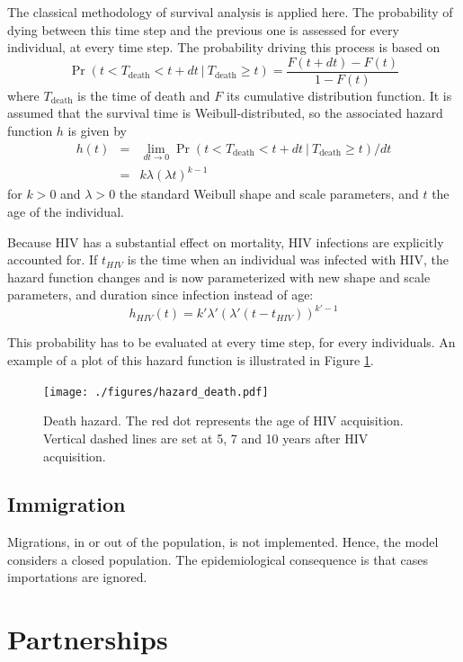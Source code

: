 \documentclass[11pt, onecolumn]{article}
\begin{document}
The classical methodology of survival analysis is applied here. The probability of dying between this time step and the previous one is assessed for every individual, at every time step. The probability driving this process is based on 
$$\Pr(t<T_{\mathrm{death}}<t+dt \ | \ T_{\mathrm{death}}\geq t) = \frac{F(t+dt)-F(t)}{1-F(t)}$$
where $T_{\mathrm{death}}$ is the time of death and $F$ its cumulative distribution function. It is assumed that the survival time is Weibull-distributed, so the associated hazard function $h$  is given by
\begin{eqnarray}
h(t) &=& \lim_{dt\to 0}\Pr(t<T_{\mathrm{death}}<t+dt \ | \ T_{\mathrm{death}}\geq t)/dt \\
 & =& k\lambda(\lambda t)^{k-1}
\end{eqnarray}
for $k>0$ and $\lambda>0$ the standard Weibull shape and scale parameters, and $t$ the age of the individual. 

Because HIV has a substantial effect on mortality, HIV infections are explicitly accounted for. If $t_{HIV}$ is the time when an individual was infected with HIV, the hazard function changes and is now parameterized with new shape and scale parameters, and duration since infection instead of age:
$$h_{HIV}(t) = k'\lambda'(\lambda' (t-t_{HIV}))^{k'-1}$$

This probability has to be evaluated at every time step, for every individuals. An example of a plot of this hazard function is illustrated in Figure \ref{fig:deathHazard}.

\begin{figure}[!ht]
\centering
    \texttt{[image: ./figures/hazard\_death.pdf]}
\caption{Death hazard. The red dot represents the age of HIV acquisition. Vertical dashed lines are set at 5, 7 and 10 years after HIV acquisition.}
\label{fig:deathHazard}
\end{figure}


\subsection{Immigration}
Migrations, in or out of the population, is not implemented. Hence, the model considers a closed population. The epidemiological consequence is that cases importations are ignored. 





\section{Partnerships}
\end{document}
